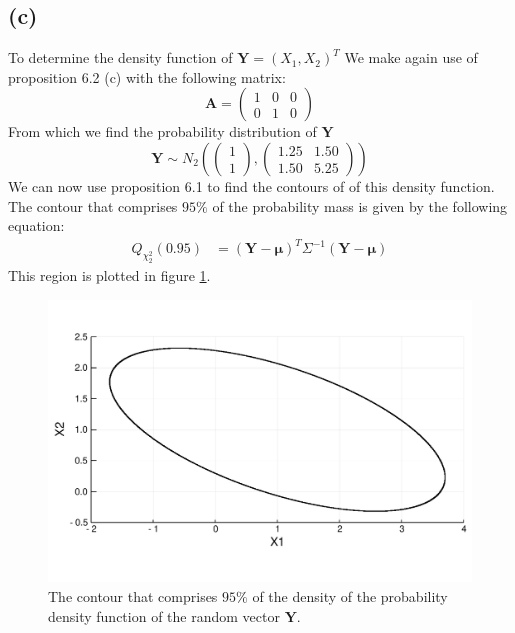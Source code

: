 \documentclass[a4paper]{article}
\begin{document}
\subsection*{(c)}
\noindent {}

To determine the density function of $\mathbf{Y}=(X_1, X_2)^T$ We make again use of proposition 6.2 (c) with the following matrix:
\begin{equation*}
	\mathbf{A} = \begin{pmatrix} 1 & 0 & 0\\ 0 & 1 & 0 \end{pmatrix}
\end{equation*}
From which we find the probability distribution of $\mathbf{Y}$
\begin{equation*}
	\mathbf{Y} \sim N_2\left( \begin{pmatrix}1\\1\end{pmatrix}, \begin{pmatrix}1.25&1.50\\1.50&5.25 \end{pmatrix}\right)
\end{equation*}
We can now use proposition 6.1 to find the contours of of this density function. The contour that comprises $95\%$ of the probability mass is given by the following equation:
\begin{align*}
	Q_{\chi^2_2}(0.95) &= (\mathbf{Y}-\mathbf{\mu})^T \Sigma^{-1} (\mathbf{Y}-\mathbf{\mu})
\end{align*}
This region is plotted in figure \ref{fig:4c}.
\begin{figure}
	\centering
	\includegraphics[width=.9\linewidth]{region-3c.pdf}
	\caption{The contour that comprises $95\%$ of the density of the probability density function of the random vector $\mathbf{Y}$.}
	\label{fig:4c}
\end{figure}
\end{document}
